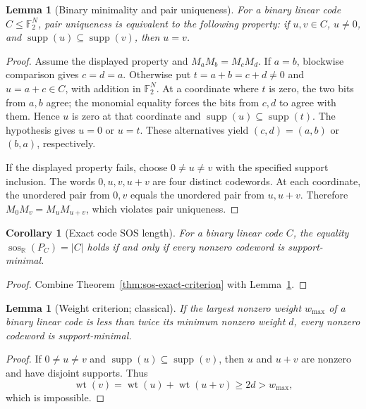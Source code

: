 \documentclass[11pt]{article}
\newtheorem{lemma}[theorem]{Lemma}
\newtheorem{corollary}[theorem]{Corollary}
\theoremstyle{definition}
\theoremstyle{remark}
\begin{document}
\begin{lemma}[Binary minimality and pair uniqueness]
\label{lem:sos-minimal-code}
For a binary linear code $C\le\mathbb F_2^N$, pair uniqueness is
equivalent to the following property: if $u,v\in C$, $u\ne0$, and
$\operatorname{supp}(u)\subseteq\operatorname{supp}(v)$, then $u=v$.
\end{lemma}
\begin{proof}
Assume the displayed property and $M_aM_b=M_cM_d$.
If $a=b$, blockwise comparison gives $c=d=a$.
Otherwise put $t=a+b=c+d\ne0$ and $u=a+c\in C$, with addition
in $\mathbb F_2^N$.
At a coordinate where $t$ is zero, the two bits from $a,b$ agree;
the monomial equality forces the bits from $c,d$ to agree with them.
Hence $u$ is zero at that coordinate and
$\operatorname{supp}(u)\subseteq\operatorname{supp}(t)$.
The hypothesis gives $u=0$ or $u=t$.
These alternatives yield $(c,d)=(a,b)$ or $(b,a)$, respectively.

If the displayed property fails, choose $0\ne u\ne v$ with the
specified support inclusion.  The words $0,u,v,u+v$ are four distinct
codewords.  At each coordinate, the unordered pair from $0,v$ equals
the unordered pair from $u,u+v$.  Therefore
$M_0M_v=M_uM_{u+v}$, which violates pair uniqueness.
\end{proof}

\begin{corollary}[Exact code SOS length]
\label{cor:sos-code-exact}
For a binary linear code $C$, the equality
$\operatorname{sos}_{\mathbb R}(P_C)=|C|$ holds if and only if every
nonzero codeword is support-minimal.
\end{corollary}
\begin{proof}
Combine Theorem~\ref{thm:sos-exact-criterion} with
Lemma~\ref{lem:sos-minimal-code}.
\end{proof}

\begin{lemma}[Weight criterion; classical]
\label{lem:sos-code-weights}
If the largest nonzero weight $w_{\max}$ of a binary linear code is
less than twice its minimum nonzero weight $d$, every nonzero
codeword is support-minimal.
\end{lemma}
\begin{proof}
If $0\ne u\ne v$ and
$\operatorname{supp}(u)\subseteq\operatorname{supp}(v)$, then $u$
and $u+v$ are nonzero and have disjoint supports.  Thus
\[
 \operatorname{wt}(v)=\operatorname{wt}(u)+\operatorname{wt}(u+v)
 \ge 2d>w_{\max},
\]
which is impossible.
\end{proof}
\end{document}
